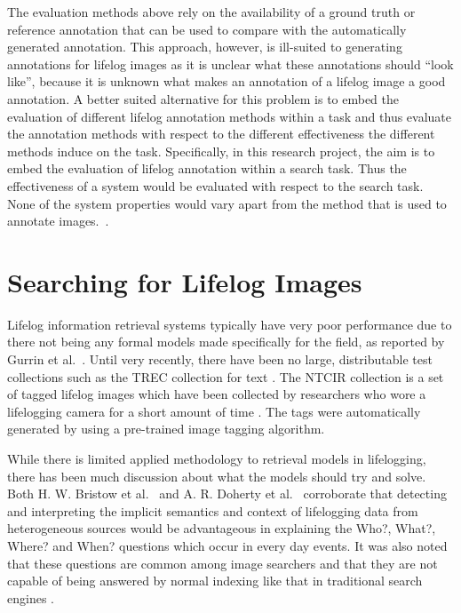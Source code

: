 \documentclass[12pt,a4paper]{article}
\begin{document}
The evaluation methods above rely on the availability of a ground truth or reference annotation that can be used to compare with the automatically generated annotation. This approach, however, is ill-suited to generating annotations for lifelog images as it is unclear what these annotations should ``look like'', because it is unknown what makes an annotation of a lifelog image a good annotation. A better suited alternative for this problem is to embed the evaluation of different lifelog annotation methods within a task and thus evaluate the annotation methods with respect to the different effectiveness the different methods induce on the task. Specifically, in this research project, the aim is to embed the evaluation of lifelog annotation within a search task. Thus the effectiveness of a system would be evaluated with respect to the search task. None of the system properties would vary apart from the method that is used to annotate images.~\cite{wei2006lda,zuccon2015integrating,karimzadehgan2010estimation,yi2009comparative}.

\section{Searching for Lifelog Images}

Lifelog information retrieval systems typically have very poor performance due to there not being any formal models made specifically for the field, as reported by Gurrin et al.~\citep{gurrin2014lifelogging}. Until very recently, there have been no large, distributable test collections such as the TREC collection for text \citep{gurrin2014lifelogging}. The NTCIR collection is a set of tagged lifelog images which have been collected by researchers who wore a lifelogging camera for a short amount of time \citep{gurrin2016ntcir}. The tags were automatically generated by using a pre-trained image tagging algorithm.

While there is limited applied methodology to retrieval models in lifelogging, there has been much discussion about what the models should try and solve. Both H.  W.  Bristow et al.~\citep{bristow2004defining} and A. R. Doherty et al.~\cite{doherty2010automatically} corroborate that detecting and interpreting the implicit semantics and context of lifelogging data from heterogeneous sources would be advantageous in explaining the Who?, What?, Where? and When? questions which occur in every day events. It was also noted that these questions are common among image searchers and that they are not capable of being answered by normal indexing like that in traditional search engines \citep{ali2010semantically}.
\end{document}

